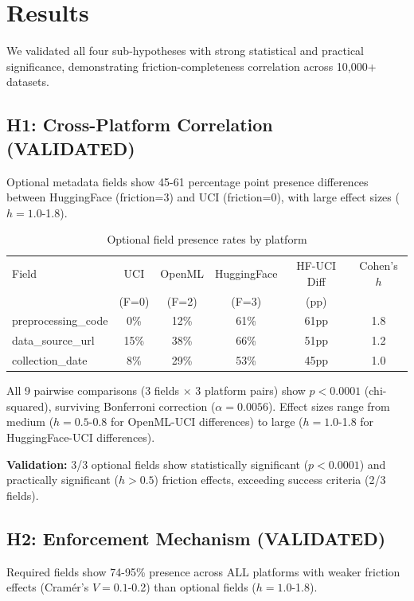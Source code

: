 \section{Results}
\label{sec:results}

We validated all four sub-hypotheses with strong statistical and practical significance, demonstrating friction-completeness correlation across 10,000+ datasets.

\subsection{H1: Cross-Platform Correlation (VALIDATED)}

Optional metadata fields show 45-61 percentage point presence differences between HuggingFace (friction=3) and UCI (friction=0), with large effect sizes ($h=1.0$-1.8).

\begin{table}[h]
\centering
\caption{Optional field presence rates by platform}
\label{tab:optional_fields}
\begin{tabular}{lccccc}
\toprule
Field & UCI & OpenML & HuggingFace & HF-UCI Diff & Cohen's $h$ \\
 & (F=0) & (F=2) & (F=3) & (pp) & \\
\midrule
preprocessing\_code & 0\% & 12\% & 61\% & 61pp & 1.8 \\
data\_source\_url & 15\% & 38\% & 66\% & 51pp & 1.2 \\
collection\_date & 8\% & 29\% & 53\% & 45pp & 1.0 \\
\bottomrule
\end{tabular}
\end{table}

All 9 pairwise comparisons (3 fields $\times$ 3 platform pairs) show $p<0.0001$ (chi-squared), surviving Bonferroni correction ($\alpha=0.0056$). Effect sizes range from medium ($h=0.5$-0.8 for OpenML-UCI differences) to large ($h=1.0$-1.8 for HuggingFace-UCI differences).

\textbf{Validation:} 3/3 optional fields show statistically significant ($p<0.0001$) and practically significant ($h>0.5$) friction effects, exceeding success criteria (2/3 fields).

\subsection{H2: Enforcement Mechanism (VALIDATED)}

Required fields show 74-95\% presence across ALL platforms with weaker friction effects (Cramér's $V=0.1$-0.2) than optional fields ($h=1.0$-1.8).

